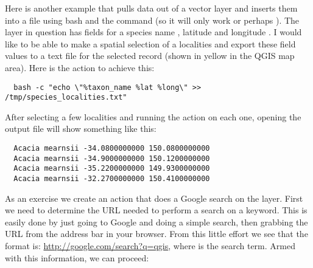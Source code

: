 Here is another example that pulls data out of a vector layer and inserts them
into a file using bash and the  command (so it will only work
\nix or perhaps \osx). The layer in question has fields for a species name
, latitude  and longitude
. I would like to be able to
make a spatial selection of a localities and export these field values to a
text file for the selected record (shown in yellow in the QGIS map area). Here is
the action to achieve this:

\begin{verbatim}
  bash -c "echo \"%taxon_name %lat %long\" >> /tmp/species_localities.txt"
\end{verbatim} 

After selecting a few localities and running the action on each one, opening
the output file will show something like this:

\begin{verbatim}
  Acacia mearnsii -34.0800000000 150.0800000000
  Acacia mearnsii -34.9000000000 150.1200000000
  Acacia mearnsii -35.2200000000 149.9300000000
  Acacia mearnsii -32.2700000000 150.4100000000
\end{verbatim} 

As an exercise we create an action that does a Google search on the 
 layer. First we need to determine the URL needed to perform a search on a
keyword. This is easily done by just going to Google and doing a simple
search, then grabbing the URL from the address bar in your browser. From this
little effort we see that the format is: \url{http://google.com/search?q=qgis},
where  is the search term. Armed with this information, we can
proceed:

